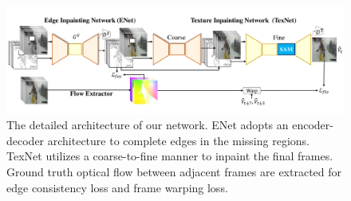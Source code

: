 \begin{figure}[!t]
	\centering
	\includegraphics[width=2.05\columnwidth]{sti} %
	\caption{The detailed architecture of our network. ENet adopts an encoder-decoder architecture to complete edges in the missing regions. TexNet utilizes a coarse-to-fine manner to inpaint the final frames. Ground truth optical flow between adjacent frames are extracted for edge consistency loss and frame warping loss. }
	
	\label{fig:stiNet}
\end{figure}




